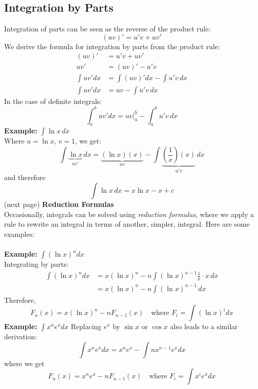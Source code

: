 \documentclass{report}
\begin{document}
\subsection{Integration by Parts} %
Integration of parts can be seen as the reverse of the product rule:
\begin{equation*}
(uv)'=u'v+uv'
\end{equation*}
We derive the formula for integration by parts from the product rule:
\begin{align*}
(uv)'&=u'v+uv'\\
uv'&=(uv)'-u'v\\
\int uv'dx&=\int(uv)'dx-\int u'v\,dx\\
\int uv'dx&=uv-\int u'v\,dx
\end{align*}
In the case of definite integrals:
\begin{equation*}
\int_a^buv'dx=uv|_a^b-\int_a^bu'v\,dx
\end{equation*}
\textbf{Example: }$\int\ln x\,dx$\\
Where $u=\ln x$, $v=1$, we get:
\begin{equation*}
\int\underbrace{\ln x}_{uv'}\,dx=\underbrace{(\ln x)(x)}_{uv}
-\int\underbrace{(\frac{1}{x})(x)}_{u'v}\,dx
\end{equation*}
and therefore
\begin{equation*}
\int\ln x\,dx=x\ln x-x+c
\end{equation*}
(next page)
\newpage
\noindent\textbf{Reduction Formulas}\\
Occasionally, integrals can be solved using \textit{reduction formulas}, where we apply a rule
to rewrite an integral in terms of another, simpler, integral.
Here are some examples:\\
\vspace{1mm}\\
\textbf{Example: }$\int(\ln x)^ndx$\\
Integrating by parts:
\begin{align*}
\int(\ln x)^ndx&=x(\ln x)^n-n\int(\ln x)^{n-1}\frac{1}{x}\cdot x\,dx\\
&=x(\ln x)^n-n\int(\ln x)^{n-1}\,dx
\end{align*}
Therefore, 
\begin{equation*}
F_n(x)=x(\ln x)^n-nF_{n-1}(x)\quad\text{where }F_i=\int(\ln x)^{i}dx
\end{equation*}
\textbf{Example: }$\int x^ne^xdx$
Replacing $e^x$ by $\sin x$ or $\cos x$ also leads to a similar derivation:
\begin{equation*}
\int x^ne^xdx=x^ne^x-\int nx^{n-1}e^xdx
\end{equation*}
where we get
\begin{equation*}
F_n(x)=x^ne^x-nF_{n-1}(x)\quad\text{where }F_i=\int x^ie^xdx
\end{equation*}
\newpage
\end{document}
